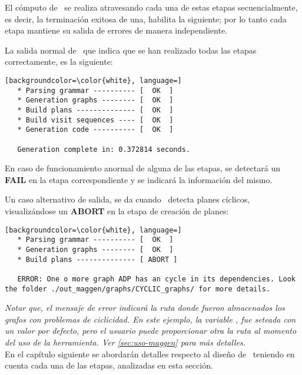 El cómputo de \maggen\ se realiza atravesando cada una de estas etapas secuencialmente, es decir, la terminación exitosa de una, habilita la siguiente; por lo tanto cada etapa mantiene su salida de errores de manera independiente. 

La salida normal de \maggen\ que indica que se han realizado todas las etapas correctamente, es la siguiente:

\vspace{0.3cm}
\begin{lstlisting}[backgroundcolor=\color{white}, language=]
   * Parsing grammar ---------- [  OK  ]
   * Generation graphs -------- [  OK  ]
   * Build plans -------------- [  OK  ]
   * Build visit sequences ---- [  OK  ]
   * Generation code ---------- [  OK  ]

   Generation complete in: 0.372814 seconds.
\end{lstlisting}
\vspace{0.3cm}

En caso de funcionamiento anormal de alguna de las etapas, se detectará un \textbf{FAIL} en la etapa correspondiente y se indicará la información del mismo.

Un caso alternativo de salida, se da cuando \maggen\ detecta planes cíclicos, visualizándose un \textbf{ABORT} en la etapa de creación de planes:

\vspace{0.3cm}
\begin{lstlisting}[backgroundcolor=\color{white}, language=] 
   * Parsing grammar ---------- [  OK  ]
   * Generation graphs -------- [  OK  ]
   * Build plans -------------- [ ABORT ]

   ERROR: One o more graph ADP has an cycle in its dependencies. Look the folder ./out_maggen/graphs/CYCLIC_graphs/ for more details.
\end{lstlisting}
\vspace{0.3cm}

\textit{Notar que, el mensaje de error indicará la ruta donde fueron almacenados los grafos con problemas de ciclicidad. En este ejemplo, la variable , fue seteada con un valor por defecto, pero el usuario puede proporcionar otra la ruta al momento del uso de la herramienta. Ver \ref{sec:uso-maggen} para más detalles.}\\

En el capítulo siguiente se abordarán detalles respecto al diseño de \maggen\ teniendo en cuenta cada una de las etapas, analizadas en esta sección.
